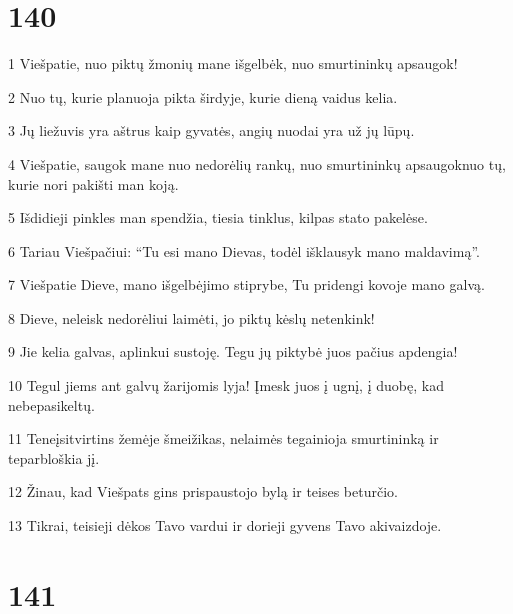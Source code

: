 \chapter{140}


\par 1 Viešpatie, nuo piktų žmonių mane išgelbėk, nuo smurtininkų apsaugok! 
\par 2 Nuo tų, kurie planuoja pikta širdyje, kurie dieną vaidus kelia. 
\par 3 Jų liežuvis yra aštrus kaip gyvatės, angių nuodai yra už jų lūpų. 
\par 4 Viešpatie, saugok mane nuo nedorėlių rankų, nuo smurtininkų apsaugok­nuo tų, kurie nori pakišti man koją. 
\par 5 Išdidieji pinkles man spendžia, tiesia tinklus, kilpas stato pakelėse. 
\par 6 Tariau Viešpačiui: “Tu esi mano Dievas, todėl išklausyk mano maldavimą”. 
\par 7 Viešpatie Dieve, mano išgelbėjimo stiprybe, Tu pridengi kovoje mano galvą. 
\par 8 Dieve, neleisk nedorėliui laimėti, jo piktų kėslų netenkink! 
\par 9 Jie kelia galvas, aplinkui sustoję. Tegu jų piktybė juos pačius apdengia! 
\par 10 Tegul jiems ant galvų žarijomis lyja! Įmesk juos į ugnį, į duobę, kad nebepasikeltų. 
\par 11 Teneįsitvirtins žemėje šmeižikas, nelaimės tegainioja smurtininką ir teparbloškia jį. 
\par 12 Žinau, kad Viešpats gins prispaustojo bylą ir teises beturčio. 
\par 13 Tikrai, teisieji dėkos Tavo vardui ir dorieji gyvens Tavo akivaizdoje.


\chapter{141}


